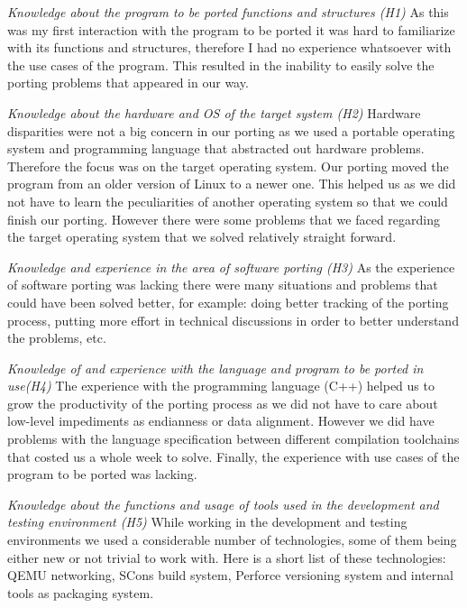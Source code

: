 \textit{Knowledge about the program to be ported functions and structures (H1)} 
As this was my first interaction with the program to be ported it was hard to
familiarize with its functions and structures, therefore I had no experience
whatsoever with the use cases of the program. This resulted in the inability to
easily solve the porting problems that appeared in our way.

\textit{Knowledge about the hardware and OS of the target system (H2)}
Hardware disparities were not a big concern in our porting as we used a portable
operating system and programming language that abstracted out hardware problems.
Therefore the focus was on the target operating system. Our porting moved the
program from an older version of Linux to a newer one. This helped us as we
did not have to learn the peculiarities of another operating system so that we
could finish our porting. However there were some problems that we faced
regarding the target operating system that we solved relatively straight
forward.

\textit{Knowledge and experience in the area of software porting (H3)}
As the experience of software porting was lacking there were many situations
and problems that could have been solved better, for example: doing better
tracking of the porting process, putting more effort in technical discussions
in order to better understand the problems, etc.

\textit{Knowledge of and experience with the language and program to be ported
in use(H4)}
The experience with the programming language (C++) helped us to grow the
productivity of the porting process as we did not have to care about low-level
impediments as endianness or data alignment. However we did have problems with
the language specification between different compilation toolchains that costed
us a whole week to solve. Finally, the experience with use cases of the program
to be ported was lacking. 

\textit{Knowledge about the functions and usage of tools used in the development
and testing environment (H5)}
While working in the development and testing environments we used a considerable
number of technologies, some of them being either new or not trivial to work
with. Here is a short list of these technologies: QEMU networking, SCons build
system, Perforce versioning system and internal tools as packaging system.


